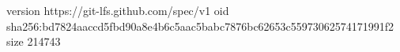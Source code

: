 version https://git-lfs.github.com/spec/v1
oid sha256:bd7824aaccd5fbd90a8e4b6c5aac5babc7876bc62653c55973062574171991f2
size 214743
